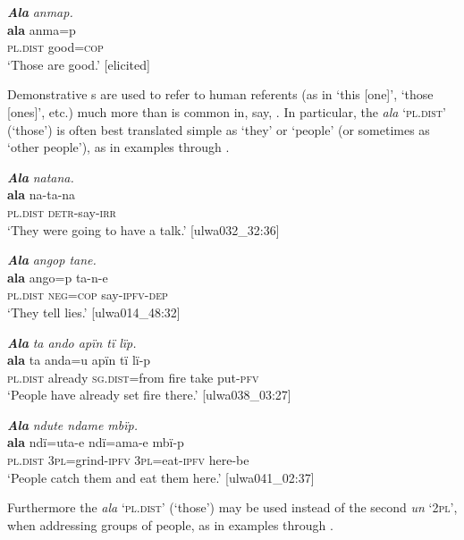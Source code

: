 \ea%
    \label{ex:det:150}
          \textbf{\textit{Ala}} \textit{anmap.}\\
\gll    \textbf{ala}      anma=p\\
    \textsc{pl.dist}  good=\textsc{cop}\\
\glt `Those are good.’ [elicited]
\z

Demonstrative s are used to refer to human referents (as in ‘this [one]’, ‘those [ones]’, etc.) much more than is common in, say, . In particular, the     \textit{ala} ‘\textsc{pl.dist}’ (‘those’) is often best translated simple as ‘they’ or ‘people’ (or sometimes as ‘other people’), as in examples  through .

\ea%
    \label{ex:det:151}
          \textbf{\textit{Ala}} \textit{natana.}\\
\gll    \textbf{ala}      na-ta-na\\
    \textsc{pl.dist}  \textsc{detr-}say-\textsc{irr}\\
\glt `They were going to have a talk.’ [ulwa032\_32:36]
\z

\ea%
    \label{ex:det:152}
          \textbf{\textit{Ala}} \textit{angop tane.}\\
\gll    \textbf{ala}      ango=p  ta-n-e\\
    \textsc{pl.dist}  \textsc{neg=cop}  say-\textsc{ipfv-dep}\\
\glt `They tell lies.’ [ulwa014\_48:32]
\z

\ea%
    \label{ex:det:153}
          \textbf{\textit{Ala}} \textit{ta ando apïn tï lïp.}\\
\gll    \textbf{ala}      ta    anda=u    apïn  tï    lï-p\\
    \textsc{pl.dist}  already  \textsc{sg.dist}=from  fire    take  put-\textsc{pfv}\\
\glt `People have already set fire there.’ [ulwa038\_03:27]
\z

\ea%
    \label{ex:det:154}
          \textbf{\textit{Ala}} \textit{ndute ndame mbïp.}\\
\gll    \textbf{ala}      ndï=uta-e      ndï=ama-e    mbï-p\\
    \textsc{pl.dist}  \textsc{3pl}=grind-\textsc{ipfv}  3\textsc{pl}=eat-\textsc{ipfv}  here-be\\
\glt `People catch them and eat them here.’ [ulwa041\_02:37]
\z

Furthermore the    \textit{ala} ‘\textsc{pl.dist}’ (‘those’) may be used instead of the second   \textit{un} ‘\textsc{2pl}’, when addressing groups of people, as in examples  through .

